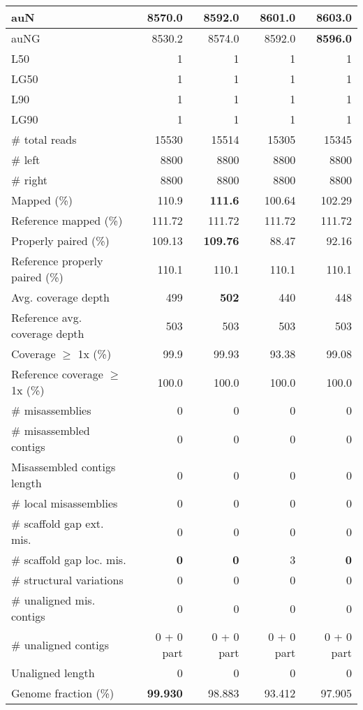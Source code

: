 \documentclass[12pt,a4paper]{article}
\begin{document}
\begin{table}[ht]
\begin{center}
\begin{tabular}{|l*{4}{|r}|}
auN & 8570.0 & 8592.0 & 8601.0 & {\bf 8603.0} \\ \hline
auNG & 8530.2 & 8574.0 & 8592.0 & {\bf 8596.0} \\ \hline
L50 & 1 & 1 & 1 & 1 \\ \hline
LG50 & 1 & 1 & 1 & 1 \\ \hline
L90 & 1 & 1 & 1 & 1 \\ \hline
LG90 & 1 & 1 & 1 & 1 \\ \hline
\# total reads & 15530 & 15514 & 15305 & 15345 \\ \hline
\# left & 8800 & 8800 & 8800 & 8800 \\ \hline
\# right & 8800 & 8800 & 8800 & 8800 \\ \hline
Mapped (\%) & 110.9 & {\bf 111.6} & 100.64 & 102.29 \\ \hline
Reference mapped (\%) & 111.72 & 111.72 & 111.72 & 111.72 \\ \hline
Properly paired (\%) & 109.13 & {\bf 109.76} & 88.47 & 92.16 \\ \hline
Reference properly paired (\%) & 110.1 & 110.1 & 110.1 & 110.1 \\ \hline
Avg. coverage depth & 499 & {\bf 502} & 440 & 448 \\ \hline
Reference avg. coverage depth & 503 & 503 & 503 & 503 \\ \hline
Coverage $\geq$ 1x (\%) & 99.9 & 99.93 & 93.38 & 99.08 \\ \hline
Reference coverage $\geq$ 1x (\%) & 100.0 & 100.0 & 100.0 & 100.0 \\ \hline
\# misassemblies & 0 & 0 & 0 & 0 \\ \hline
\# misassembled contigs & 0 & 0 & 0 & 0 \\ \hline
Misassembled contigs length & 0 & 0 & 0 & 0 \\ \hline
\# local misassemblies & 0 & 0 & 0 & 0 \\ \hline
\# scaffold gap ext. mis. & 0 & 0 & 0 & 0 \\ \hline
\# scaffold gap loc. mis. & {\bf 0} & {\bf 0} & 3 & {\bf 0} \\ \hline
\# structural variations & 0 & 0 & 0 & 0 \\ \hline
\# unaligned mis. contigs & 0 & 0 & 0 & 0 \\ \hline
\# unaligned contigs & 0 + 0 part & 0 + 0 part & 0 + 0 part & 0 + 0 part \\ \hline
Unaligned length & 0 & 0 & 0 & 0 \\ \hline
Genome fraction (\%) & {\bf 99.930} & 98.883 & 93.412 & 97.905 \\ \hline

\end{tabular}
\end{center}
\end{table}
\end{document}
